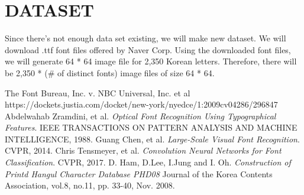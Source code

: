 \documentclass[%
 reprint,
nofootinbib,
nobibnotes,
amsmath,amssymb,
aps,
]{revtex4-1}
\begin{document}
\section{\label{sec:level2}DATASET}
Since there's not enough data set existing, we will make new dataset.
We will download .ttf font files offered by Naver Corp.
Using the downloaded font files, we will generate 64 * 64 image file for 2,350 Korean letters.
Therefore, there will be 2,350 * (\# of distinct fonts) image files of size 64 * 64.

\begin{thebibliography}{1}
 The Font Bureau, Inc. v. NBC Universal, Inc. et al\\
https://dockets.justia.com/docket/new-york/nyedce/1:2009cv04286/296847
 Abdelwahab Zramdini, et al. {\em Optical Font Recognition
  Using Typographical Features}.\/ IEEE TRANSACTIONS ON PATTERN ANALYSIS AND
    MACHINE INTELLIGENCE, 1988.
 Guang Chen, et al. {\em Large-Scale Visual Font Recognition}.
\/ CVPR, 2014.
 Chris Tensmeyer, et al. {\em Convolution Neural Networks
  for Font Classification}. CVPR, 2017.
 D. Ham, D.Lee, I.Jung and I. Oh. {\em Construction of Printd
  Hangul Character Database PHD08} Journal of the Korea Contents Association,
    vol.8, no.11, pp. 33-40, Nov. 2008.
\end{thebibliography}




\flushend
\end{document}
